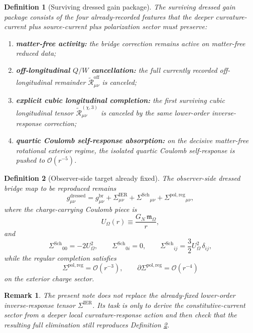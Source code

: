 \documentclass[11pt]{article}
\newcommand{\CoulPot}{U_\Omega}
\newcommand{\HamChargeOmega}{\mathfrak m_\Omega}
\newcommand{\SigmaIER}{\Sigma^{\mathrm{IER}}}
\newcommand{\SigmaDressSch}{\Sigma^{\mathrm{Sch}}}
\newcommand{\SigmaRegPol}{\Sigma^{\mathrm{pol,reg}}}
\newcommand{\ReOff}{\widetilde{\mathcal R}_{\mu\nu}^{\mathrm{off}}}
\newcommand{\ReLongThree}{\widetilde{\mathcal R}_{\mu\nu}^{(\chi,3)}}
\newtheorem{definition}{Definition}
\newtheorem{remark}{Remark}
\begin{document}
\begin{definition}[Surviving dressed gain package]
\label{def:gains}
The \emph{surviving dressed gain package} consists of the four already-recorded features that the deeper curvature-current plus source-current plus polarization sector must preserve:
\begin{enumerate}
    \item \textbf{matter-free activity:} the bridge correction remains active on matter-free reduced data;
    \item \textbf{off-longitudinal \(Q/W\) cancellation:} the full currently recorded off-longitudinal remainder \(\ReOff\) is canceled;
    \item \textbf{explicit cubic longitudinal completion:} the first surviving cubic longitudinal tensor \(\ReLongThree\) is canceled by the same lower-order inverse-response correction;
    \item \textbf{quartic Coulomb self-response absorption:} on the decisive matter-free rotational exterior regime, the isolated quartic Coulomb self-response is pushed to \(\mathcal O(r^{-5})\).
\end{enumerate}
\end{definition}

\begin{definition}[Observer-side target already fixed]
\label{def:target}
The observer-side dressed bridge map to be reproduced remains
\begin{equation}
g_{\mu\nu}^{\mathrm{dressed}}
=
g_{\mu\nu}^{\mathrm{br}}
+\SigmaIER_{\mu\nu}
+\SigmaDressSch{}_{\mu\nu}
+\SigmaRegPol{}_{\mu\nu},
\label{eq:targetmetric}
\end{equation}
where the charge-carrying Coulomb piece is
\begin{equation}
\CoulPot(r)\equiv \frac{G_N\,\HamChargeOmega}{r},
\label{eq:coulpot}
\end{equation}
and
\begin{equation}
\SigmaDressSch{}_{00}=-2\CoulPot^2,
\qquad
\SigmaDressSch{}_{0i}=0,
\qquad
\SigmaDressSch{}_{ij}=\frac32\CoulPot^2\,\delta_{ij},
\label{eq:schdress}
\end{equation}
while the regular completion satisfies
\begin{equation}
\SigmaRegPol=\mathcal O(r^{-3}),
\qquad
\partial\SigmaRegPol=\mathcal O(r^{-4})
\label{eq:reg}
\end{equation}
on the exterior charge sector.
\end{definition}

\begin{remark}
The present note does not replace the already-fixed lower-order inverse-response tensor \(\SigmaIER\). Its task is only to derive the constitutive-current sector from a deeper local curvature-response action and then check that the resulting full elimination still reproduces Definition \ref{def:target}.
\end{remark}
\end{document}
